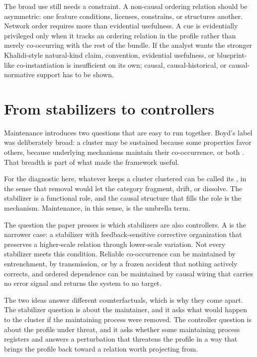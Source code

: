 \documentclass[12pt]{article}
\begin{document}
The broad use still needs a constraint. A non-causal ordering relation should be
asymmetric: one feature conditions, licenses, constrains, or structures another.
Network order requires more than evidential usefulness. A cue is evidentially
privileged only when it tracks an ordering relation in the profile rather than
merely co-occurring with the rest of the bundle. If the analyst wants the
stronger Khalidi-style natural-kind claim, convention, evidential usefulness, or
blueprint-like co-instantiation is insufficient on its own; causal,
causal-historical, or causal-normative support has to be shown.

\section{From stabilizers to controllers}

Maintenance introduces two questions that are easy to run together. Boyd's
 label was deliberately broad: a cluster may be sustained
because some properties favor others, because underlying mechanisms maintain
their co-occurrence, or both \citep{boyd1999}. That breadth is part of what made
the framework useful.

For the diagnostic here, whatever keeps a cluster clustered can be called its
, in the sense that removal would let the category fragment,
drift, or dissolve. The stabilizer is a functional role, and the causal structure
that fills the role is the mechanism. Maintenance, in this sense, is the umbrella
term.

The question the paper presses is which stabilizers are also controllers. A
 is the narrower case: a stabilizer with feedback-sensitive
corrective organization that preserves a higher-scale relation through lower-scale
variation. Not every stabilizer meets this condition. Reliable co-occurrence can be
maintained by entrenchment, by transmission, or by a frozen accident that nothing
actively corrects, and ordered dependence can be maintained by causal wiring that
carries no error signal and returns the system to no target.

The two ideas answer different counterfactuals, which is why they come apart. The
stabilizer question is about the maintainer, and it asks what would happen to the
cluster if the maintaining process were removed. The controller question is about
the profile under threat, and it asks whether some maintaining process registers
and answers a perturbation that threatens the profile in a way that brings the
profile back toward a relation worth projecting from.
\end{document}
